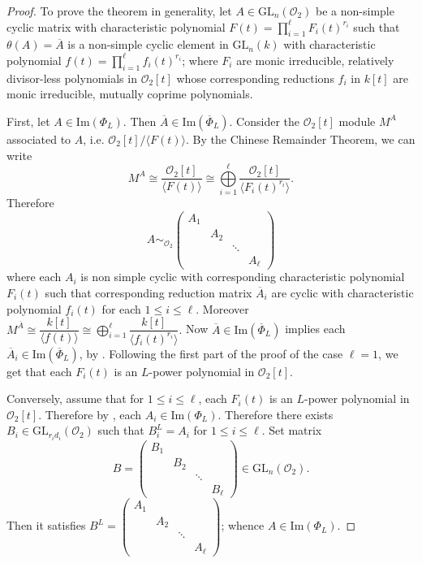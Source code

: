\documentclass[11pt,twoside]{amsart}
\newcommand{\GL}{\mathrm{GL}}
\newcommand{\im}{\mathrm{Im}}
\newcommand{\R}{\mathscr{O}_2}
\theoremstyle{definition} %
\begin{document}
\begin{proof}
To prove the theorem in generality, let $A\in \GL_n(\mathcal{O}_2)$ be a non-simple cyclic matrix with characteristic polynomial $F(t)=\prod\limits_{i=1}^\ell F_i(t)^{r_i}$ such that $\theta(A)= \overline{A}$ is a non-simple cyclic element in $\GL_n(k)$ with characteristic polynomial $f(t)=\prod\limits_{i=1}^\ell f_i(t)^{r_i}$; where $F_i$ are monic irreducible, relatively divisor-less polynomials in $\R[t]$ whose corresponding reductions $f_i$ in $k[t]$ are monic irreducible, mutually coprime polynomials.
    
First, let $A\in \im(\Phi_L)$. 
Then $\overline{A}\in \im(\overline{\Phi}_L)$. 
Consider the $\R[t]$ module $M^A$ associated to $A$, i.e. $\R[t]/\langle F(t)\rangle$.
By the Chinese Remainder Theorem, we can write $$M^A\cong\dfrac{\R[t]}{\langle F(t)\rangle}\cong \bigoplus\limits_{i=1}^\ell \dfrac{\R[t]}{\langle F_i(t)^{r_i}\rangle}.$$ 
Therefore $$A\sim_{\R} \begin{pmatrix}  %
A_1 &        &        & \\
& A_2    &        & \\
&        & \ddots & \\
&        &        & A_\ell
\end{pmatrix}$$
where each $A_i$ is non simple cyclic with corresponding characteristic polynomial $F_i(t)$ such that corresponding reduction matrix $\overline{A}_i$ are cyclic with characteristic polynomial $f_i(t)$ for each $1\leq i\leq\ell$.
Moreover $M^{\overline{A}}\cong \dfrac{k[t]}{\langle f(t)\rangle}\cong \bigoplus\limits_{i=1}^\ell \dfrac{k[t]}{\langle f_i(t)^{r_i}\rangle}.$ 
Now $\overline{A}\in \im(\overline{\Phi}_L)$ implies each $\overline{A}_i\in \im(\overline{\Phi}_L)$, by \cite[Theorem 1]{Otero90}.
Following the first part of the proof of the case $\ell=1$, we get that each $F_i(t)$ is an $L$-power polynomial in $\R[t]$.

Conversely, assume that for $1\leq i\leq \ell$, each $F_i(t)$ is an $L$-power polynomial in $\R[t]$. 
Therefore by , each $A_i\in \im(\Phi
_L)$.
Therefore there exists $B_i\in \GL_{r_id_i}(\R)$ such that $B_i^L=A_i$ for $1\leq i\leq\ell$. 
Set matrix $$B= \begin{pmatrix}  %
    B_1 &        &        & \\
        & B_2    &        & \\
        &        & \ddots & \\
        &        &        & B_\ell
\end{pmatrix}\in\GL_n(\R).$$ Then it satisfies $B^L= \begin{pmatrix}  %
    A_1 &        &        & \\
        & A_2    &        & \\
        &        & \ddots & \\
        &        &        & A_\ell
\end{pmatrix}$; whence $A\in \im(\Phi_L)$.
\end{proof}
\end{document}
